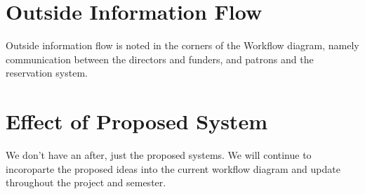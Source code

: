 \documentclass[12pt]{article} %
\begin{document}
\section{Outside Information Flow} %
Outside information flow is noted in the corners of the Workflow diagram, namely communication between the directors and funders, and patrons and the reservation system.

\section{Effect of Proposed System} %
We don't have an after, just the proposed systems.  We will continue to incoroparte the proposed ideas into the current workflow diagram and update throughout the project and semester.
\end{document}
